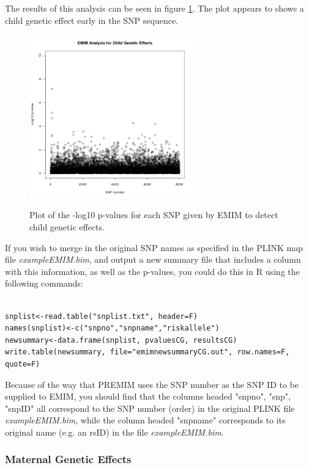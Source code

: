 \documentclass[a4paper,12pt]{article}
\begin{document}
The results of this analysis can be seen in figure  \ref{childeffs-fig}. The plot appears to shows a child genetic effect early in the SNP sequence. 
{\begin{figure}[ht]
{\begin{center}
{\includegraphics[width=200pt]{plotChildEffects.png}}
\caption{Plot of the -log10 p-values for each SNP given by EMIM to detect child genetic effects.}
\label{childeffs-fig}
\end{center}}
\end{figure}
}

If you wish to merge in the original SNP names as specified in the PLINK map file {\it exampleEMIM.bim}, and output a new summary file that includes a column with this information, as well as the p-values, you could do this in R using the following commands: 
\vspace{0.35cm} \begin{lstlisting}

snplist<-read.table("snplist.txt", header=F)
names(snplist)<-c("snpno","snpname","riskallele")
newsummary<-data.frame(snplist, pvaluesCG, resultsCG)
write.table(newsummary, file="emimnewsummaryCG.out", row.names=F, quote=F)

\end{lstlisting} \vspace{0.35cm}
Because of the way that PREMIM uses the SNP number as the SNP ID to be supplied to EMIM, you should find that the columns headed "snpno", "snp", "snpID" all correspond to the SNP number (order) in the original PLINK file {\it exampleEMIM.bim}, while the column headed "snpname" corresponds to its original name (e.g. an rsID) in the file {\it exampleEMIM.bim}. 

\subsubsection{Maternal Genetic Effects}
\label{eg-maternal}
\end{document}
